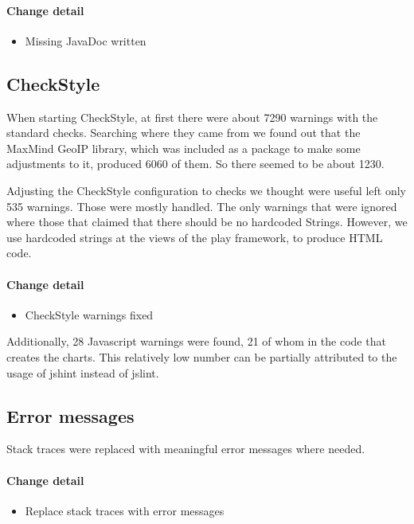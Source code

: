 \paragraph{Change detail}
\begin{itemize}
  \item Missing JavaDoc written
\end{itemize}

\pagebreak[4]
\subsection{CheckStyle}\label{cs} 
When starting CheckStyle, at first there were about 7290 warnings with the standard checks.
Searching where they came from we found out that the MaxMind GeoIP library, 
which was included as a package to make some adjustments to it, produced 6060 of them. So there seemed to be about
1230.

Adjusting the CheckStyle configuration to checks we thought were useful left only 535 warnings.
Those were mostly handled. The only warnings that were ignored where those that claimed that there should be no hardcoded Strings.
However, we use hardcoded strings at the views of the play framework, to produce HTML code.

\paragraph{Change detail}
\begin{itemize}
  \item CheckStyle warnings fixed
\end{itemize}

Additionally, 28 Javascript warnings were found, 21 of whom in the code that creates the charts.
This relatively low number can be partially attributed to the usage of jshint instead of jslint.

\subsection{Error messages}
Stack traces were replaced with meaningful error messages where needed.

\paragraph{Change detail}
\begin{itemize}
  \item Replace stack traces with error messages
\end{itemize}

 

